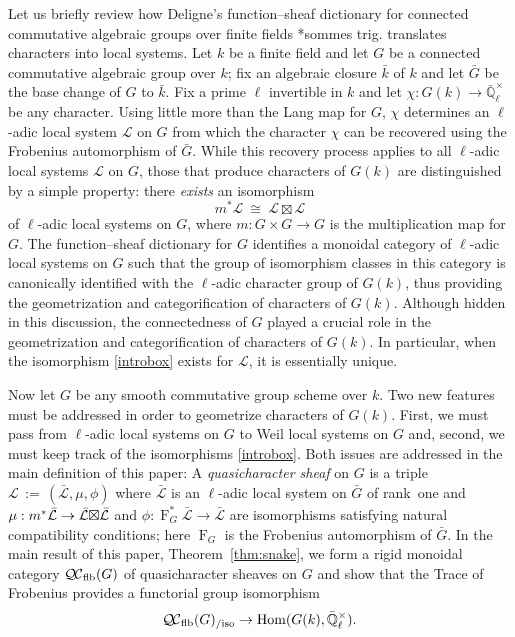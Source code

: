 \documentclass{amsart}
\theoremstyle{plain}
\theoremstyle{definition}
\theoremstyle{remark}
\newcommand{\EE}{\mathbb{\bar Q}_\ell}
\newcommand{\bFq}{\bar{k}}
\newcommand{\Fq}{k}
\newcommand{\EEx}{\EE^\times}
\newcommand{\Frob}[1]{\operatorname{F}_{#1}}
\DeclareMathOperator{\Hom}{Hom}
\newcommand{\ceq}{{\, :=\, }}
\newcommand{\iso}{{\ \cong\ }}
\newcommand{\qcs}[1]{{\mathcal{#1}}}
\newcommand{\gqcs}[1]{{\mathcal{\bar #1}}}
\newcommand{\QC}{{\mathcal{Q\hskip-0.8pt C}}}
\newcommand{\lQC}{{\QC_\text{flb}}}
\newcommand{\lQCiso}[1]{\lQC(#1)_{/\text{iso}}}
\newcommand{\bG}{\bar{G}}
\newcommand{\tight}[3]{\hspace{-#1pt}{#2}\hspace{-#3pt}}
\newcommand{\LxL}{\text{$\gqcs{L} \tight{0}{\boxtimes}{0} \gqcs{L}$}}
\begin{document}
Let us briefly review how Deligne's function--sheaf dictionary for connected commutative algebraic groups over finite fields \cite{deligne:SGA4.5}*{sommes trig.} translates characters into local systems.
Let $\Fq$ be a finite field and let $G$ be a connected commutative algebraic group over $\Fq$; fix an algebraic closure $\bFq$ of $\Fq$
and let $\bG$ be the base change of $G$ to $\bFq$.
Fix a prime $\ell$ invertible in $\Fq$ and let $\chi : G(\Fq) \to \EEx$ be any character.
Using little more than the Lang map for $G$, $\chi$ determines an $\ell$-adic local system $\qcs{L}$ on $G$ from which the character $\chi$ can be recovered using the Frobenius automorphism of $\bG$.
While this recovery process applies to all $\ell$-adic local systems $\qcs{L}$ on $G$, those that produce characters of $G(\Fq)$ are distinguished by a simple property: there \emph{exists} an isomorphism
\begin{equation}\label{introbox}
m^* \qcs{L} \iso \qcs{L} \boxtimes \qcs{L}
\end{equation}
 of $\ell$-adic local systems on $G$, where $m : G\times G \to G$ is the multiplication map for $G$. The function--sheaf dictionary for $G$ identifies a monoidal category of $\ell$-adic local systems on $G$ such that the group of isomorphism classes in this category is canonically identified with the $\ell$-adic character group of $G(\Fq)$, thus providing the geometrization and categorification of characters of $G(\Fq)$.
%
Although hidden in this discussion, the connectedness of $G$ played a crucial role in the geometrization and categorification of characters of $G(\Fq)$.
In particular, when the isomorphism \eqref{introbox} exists for $\qcs{L}$, it is essentially unique.

Now let $G$ be any smooth commutative group scheme over $\Fq$.
Two new features must be addressed in order to geometrize characters of $G(\Fq)$.
First, we must pass from $\ell$-adic local systems on $G$ to Weil local systems on $G$
and, second, we must keep track of the isomorphisms \eqref{introbox}.
Both issues are addressed in the main definition of this paper:
A \emph{quasicharacter sheaf} on $G$ is a triple $\qcs{L}\ceq
(\gqcs{L},\mu,\phi)$ where $\gqcs{L}$ is an $\ell$-adic local system on $\bG$ of rank~one and $\mu: m^*
\gqcs{L} \to \LxL$ and $\phi : \Frob{G}^*\gqcs{L} \to \gqcs{L}$ are isomorphisms satisfying natural compatibility conditions; here $\Frob{G}$ is the Frobenius automorphism of ${\bar G}$.
 In the main result of this paper, Theorem~\ref{thm:snake},
we form a rigid monoidal category $\lQC(G)$ of quasicharacter sheaves on $G$
and show that the Trace of Frobenius provides a functorial group isomorphism
\begin{equation}
\lQCiso{G} \to \Hom(G(\Fq), \EEx).
\end{equation}
\end{document}
